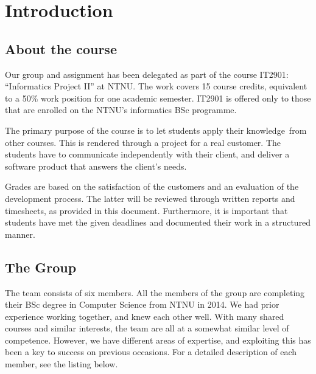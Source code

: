 \chapter{Introduction}
\section{About the course}
Our group and assignment has been delegated as part of the course
IT2901: ``Informatics Project II''
at NTNU. The work covers 15 course credits, equivalent to a 50\% work
position for one academic semester. IT2901 is offered only to those
that are enrolled on the NTNU's informatics BSc
programme.

The primary purpose of the course is to let students apply their
knowledge\ from other courses. This is rendered through a project for a
real customer. The students have to communicate independently with
their client, and deliver a software product that answers the
client's needs. 

Grades are based on the satisfaction of the customers and an evaluation
of the development process. The latter will be reviewed through written
reports and timesheets, as provided in this document. Furthermore, it
is important that students have met the given deadlines and documented
their work in a structured manner.

\section{The Group}

The team consists of six members. All the members of the group are
completing their BSc degree in Computer Science from NTNU in 2014. We
had prior experience working together, and knew each other well. With
many shared courses and similar interests, the team are all at a
somewhat similar level of competence. However, we have different areas
of expertise, and exploiting this has been a key to success on previous
occasions. For a detailed description of each member, see the listing
below.


